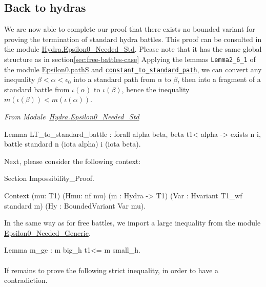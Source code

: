 \subsection{Back to hydras}
\label{sec:standard-battles-cases}
We are now able to complete our proof that there exists no bounded variant for proving the termination of standard hydra battles. This proof can
be consulted in the module 
\href{../theories/html/hydras.Hydra.Epsilon0_Needed_Std.html}{Hydra.Epsilon0\_Needed\_Std}.
Please note that it has the same global structure as in section\ref{sec:free-battles-case} 
Applying the  lemmas  \texttt{Lemma2\_6\_1} of the module 
\href{../theories/html/hydras.Epsilon0.Paths.html\#Lemma2_6_1}%
{Epsilon0.pathS}   and 
\href{../theories/html/hydras.Epsilon0.Paths.html\#constant_to_standard_path}%
{\texttt{constant\_to\_standard\_path}},
we can convert any inequality $\beta<\alpha<\epsilon_0$ into a standard path from
$\alpha$ to  $\beta$, then into a fragment of a standard battle from 
$\iota(\alpha)$ to $\iota(\beta)$, hence the inequality $m(\iota(\beta))<m(\iota(\alpha))$.


\vspace{4pt}
\emph{From Module~\href{../theories/html/hydras.Hydra.Epsilon0_Needed_Std.html\#LT_to_standard_battle}{Hydra.Epsilon0\_Needed\_Std}}

\begin{Coqsrc}
Lemma LT_to_standard_battle :
    forall alpha beta,
      beta t1< alpha ->
      exists n i,  battle standard  n (iota alpha) i (iota beta).
\end{Coqsrc}


Next, please consider the following context:

\begin{Coqsrc}
Section Impossibility_Proof.

Context (mu: T1)
          (Hmu: nf mu)
          (m : Hydra -> T1)
          (Var : Hvariant  T1_wf standard m)
          (Hy : BoundedVariant Var mu).
 \end{Coqsrc}

In the same way as for free battles, we import a large inequality 
from 
the module \href{../theories/html/hydras.Hydra.Epsilon0_Needed_Generic.html}{Epsilon0\_Needed\_Generic}.


\begin{Coqsrc}
 Lemma m_ge : m big_h t1<= m small_h.
\end{Coqsrc}

\paragraph*{} If remains to prove the following strict inequality, in order to have a contradiction.

